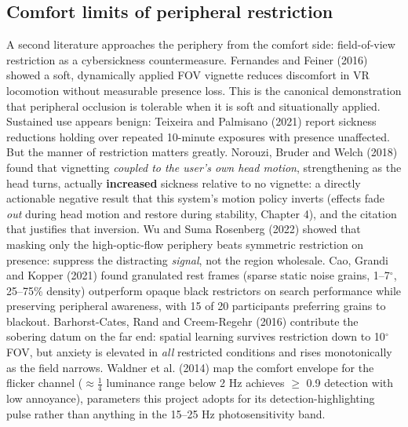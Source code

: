 \subsection{Comfort limits of peripheral restriction}

A second literature approaches the periphery from the comfort side: field-of-view restriction as a
cybersickness countermeasure. Fernandes and Feiner (2016) showed a soft, dynamically applied FOV
vignette reduces discomfort in VR locomotion without measurable presence loss. This is the canonical
demonstration that peripheral occlusion is tolerable when it is soft and situationally applied.
Sustained use appears benign: Teixeira and Palmisano (2021) report sickness reductions holding over repeated
10-minute exposures with presence unaffected. But the manner of restriction matters greatly. Norouzi,
Bruder and Welch (2018) found that vignetting \textit{coupled to the user's own head motion}, strengthening
as the head turns, actually \textbf{increased} sickness relative to no vignette: a directly actionable
negative result that this system's motion policy inverts (effects fade \textit{out} during head motion and
restore during stability, Chapter 4), and the citation that justifies that inversion. Wu and Suma
Rosenberg (2022) showed that masking only the high-optic-flow periphery beats symmetric restriction
on presence: suppress the distracting \textit{signal}, not the region wholesale. Cao, Grandi and
Kopper (2021) found granulated rest frames (sparse static noise grains, 1–7$^{\circ}$, 25–75\% density)
outperform opaque black restrictors on search performance while preserving peripheral awareness,
with 15 of 20 participants preferring grains to blackout. Barhorst-Cates, Rand and Creem-Regehr
(2016) contribute the sobering datum on the far end: spatial learning survives restriction down to
10$^{\circ}$ FOV, but anxiety is elevated in \textit{all} restricted conditions and rises monotonically as the field
narrows. Waldner et al. (2014) map the comfort envelope for the flicker channel ($\approx \frac{1}{4}$ luminance range
below 2 Hz achieves $\geq$ 0.9 detection with low annoyance), parameters this project adopts for its
detection-highlighting pulse rather than anything in the 15–25 Hz photosensitivity band.

